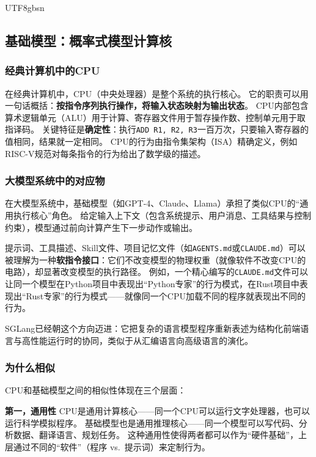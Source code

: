 \documentclass[11pt,a4paper]{article}
\begin{document}
\begin{CJK*}{UTF8}{gbsn}
\subsection{基础模型：概率式模型计算核}
\label{sec:model}

\subsubsection{经典计算机中的CPU}

在经典计算机中，CPU（中央处理器）是整个系统的执行核心。
它的职责可以用一句话概括：\textbf{按指令序列执行操作，将输入状态映射为输出状态}。
CPU内部包含算术逻辑单元（ALU）用于计算、寄存器文件用于暂存操作数、控制单元用于取指译码。
关键特征是\textbf{确定性}：执行\texttt{ADD R1, R2, R3}一百万次，只要输入寄存器的值相同，结果就一定相同。
CPU的行为由指令集架构（ISA）精确定义，例如RISC-V规范对每条指令的行为给出了数学级的描述\cite{riscv_spec_2026}。

\subsubsection{大模型系统中的对应物}

在大模型系统中，基础模型（如GPT-4、Claude、Llama）承担了类似CPU的``通用执行核心''角色。
给定输入上下文（包含系统提示、用户消息、工具结果与控制约束），模型通过前向计算产生下一步动作或输出\cite{vaswani2017attention,brown2020gpt3,llama2023}。

提示词、工具描述、Skill文件、项目记忆文件（如\texttt{AGENTS.md}或\texttt{CLAUDE.md}）可以被理解为一种\textbf{软指令接口}：它们不改变模型的物理权重（就像软件不改变CPU的电路），却显著改变模型的执行路径\cite{openai_codex_agents_md_2026,openai_codex_skills_2026,anthropic_claudecode_memory_2026}。
例如，一个精心编写的\texttt{CLAUDE.md}文件可以让同一个模型在Python项目中表现出``Python专家''的行为模式，在Rust项目中表现出``Rust专家''的行为模式——就像同一个CPU加载不同的程序就表现出不同的行为。

SGLang已经朝这个方向迈进：它把复杂的语言模型程序重新表述为结构化前端语言与高性能运行时的协同，类似于从汇编语言向高级语言的演化\cite{sglang2024,sglang_docs_2026}。

\subsubsection{为什么相似}

CPU和基础模型之间的相似性体现在三个层面：

\textbf{第一，通用性}
CPU是通用计算核心——同一个CPU可以运行文字处理器，也可以运行科学模拟程序。
基础模型也是通用推理核心——同一个模型可以写代码、分析数据、翻译语言、规划任务。
这种通用性使得两者都可以作为``硬件基础''，上层通过不同的``软件''（程序 vs.\ 提示词）来定制行为。


\end{CJK*}
\end{document}
